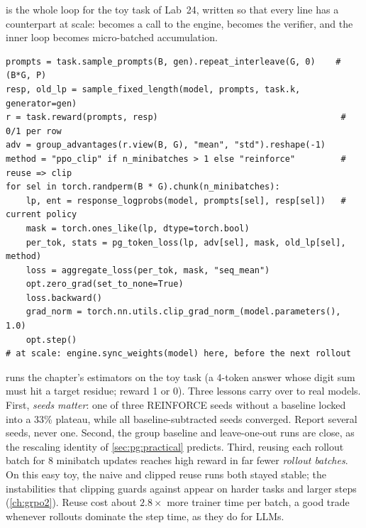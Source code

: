  is the whole loop for the toy task of Lab~24, written so that every line
has a counterpart at scale:  becomes a call to the engine,
 becomes the verifier, and the inner loop becomes micro-batched
accumulation.

\begin{lstlisting}[caption={One on-policy step with optional off-policy reuse (abridged from \code{llmsys.pg.train\_toy}).},label={lst:pg:step}]
prompts = task.sample_prompts(B, gen).repeat_interleave(G, 0)    # (B*G, P)
resp, old_lp = sample_fixed_length(model, prompts, task.k, generator=gen)
r = task.reward(prompts, resp)                                    # 0/1 per row
adv = group_advantages(r.view(B, G), "mean", "std").reshape(-1)
method = "ppo_clip" if n_minibatches > 1 else "reinforce"         # reuse => clip
for sel in torch.randperm(B * G).chunk(n_minibatches):
    lp, ent = response_logprobs(model, prompts[sel], resp[sel])   # current policy
    mask = torch.ones_like(lp, dtype=torch.bool)
    per_tok, stats = pg_token_loss(lp, adv[sel], mask, old_lp[sel], method)
    loss = aggregate_loss(per_tok, mask, "seq_mean")
    opt.zero_grad(set_to_none=True)
    loss.backward()
    grad_norm = torch.nn.utils.clip_grad_norm_(model.parameters(), 1.0)
    opt.step()
# at scale: engine.sync_weights(model) here, before the next rollout
\end{lstlisting}

 runs the chapter's estimators on the toy task (a 4-token answer whose
digit sum must hit a target residue; reward 1 or 0). Three lessons carry over to real
models. First, \emph{seeds matter}: one of three REINFORCE seeds without a baseline locked
into a 33\% plateau, while all baseline-subtracted seeds converged. Report several seeds,
never one. Second, the group baseline and leave-one-out runs are close, as the rescaling
identity of \cref{sec:pg:practical} predicts. Third, reusing each rollout batch for 8
minibatch updates reaches high reward in far fewer \emph{rollout batches}. On this easy
toy, the naive and clipped reuse runs both stayed stable; the instabilities that clipping
guards against appear on harder tasks and larger steps (\cref{ch:grpo2}). Reuse cost about
$2.8\times$ more trainer time per batch, a good trade whenever rollouts dominate the step
time, as they do for LLMs.


